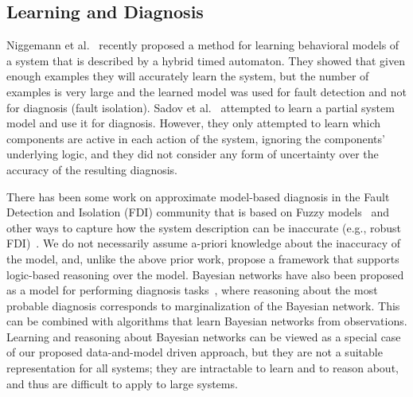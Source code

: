 \documentclass[12pt]{article}
\newcommand{\note}[1]{\textbf{\textit{#1}}}
\begin{document}
\subsection{Learning and Diagnosis}
Niggemann et al.~\cite{niggemann2012learning} recently proposed a method for learning behavioral models of a system that is described by a hybrid timed automaton. They showed that given enough examples they will accurately learn the system, but the number of examples is very large 
and the learned model was used for fault detection and not for diagnosis (fault isolation). Sadov et al.~\cite{sadov2010towards} attempted to learn a partial system model and use it for diagnosis. However, they only attempted to learn which components are active in each action of the system, ignoring the components' underlying logic, and they did not consider any form of uncertainty over the  accuracy of the resulting diagnosis. 

There has been some work on approximate model-based diagnosis in the Fault Detection and Isolation (FDI) community that is based on Fuzzy models~\cite{dexter1997model,mendoncca2003fault,castillo2005model,mendoncca2009architecture} and other ways to capture how the system description can be inaccurate (e.g., robust FDI)~\cite{chen2012robust,frank1997survey}. 
We do not necessarily assume a-priori knowledge about the inaccuracy of the model, and, unlike the above prior work, propose a framework that supports logic-based reasoning over the model.
Bayesian networks have also been proposed as a model for performing diagnosis tasks~\cite{darwiche2009modeling,el1995diagnosing}, where reasoning about the most probable diagnosis corresponds to marginalization of the Bayesian network. This can be combined with algorithms that learn Bayesian networks from observations. Learning and reasoning about Bayesian networks can be viewed as a special case of our proposed data-and-model driven approach, but they are not a suitable representation for all systems; they are intractable  to learn and to reason about, and thus are difficult to  apply to large systems. 

\end{document}
